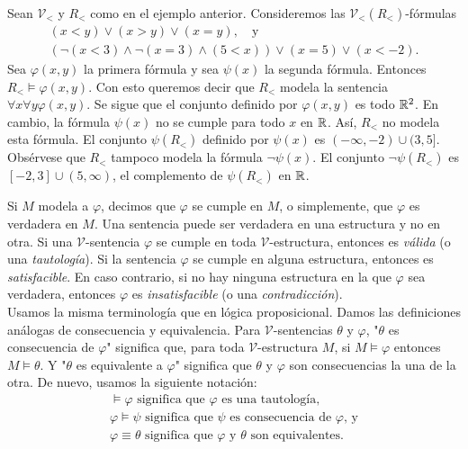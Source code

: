 \message{ !name(main.tex)}\documentclass[12pt,a4paper]{book}
\newcommand{\comillas}[1]{"#1"}
\newcommand{\VV}{\mathcal{V}}
\begin{document}
    \begin{ejemplo}\label{ej:conjunto-definible-orden}
        Sean $\VV_{<}$ y $R_{<}$ como en el ejemplo anterior. Consideremos las $\VV_{<}(R_{<})$-fórmulas
        \begin{gather*}
            (x<y)\vee(x>y)\vee(x=y),\quad\text{y}\\
            (\neg(x<3)\wedge\neg(x=3)\wedge(5<x))\vee(x=5)\vee(x<-2).
        \end{gather*}
        Sea $\varphi(x,y)$ la primera fórmula y sea $\psi(x)$ la segunda fórmula. Entonces $R_{<}\models\varphi(x,y)$. Con
        esto queremos decir que $R_{<}$ modela la sentencia $\forall x\forall y\varphi(x,y)$. Se sigue que el conjunto
        definido por $\varphi(x,y)$ es todo $\mathbb{R}^{2}$. En cambio, la fórmula $\psi(x)$ no se cumple para todo $x$ en $\mathbb{R}$.
        Así, $R_{<}$ no modela esta fórmula. El conjunto $\psi(R_{<})$ definido por $\psi(x)$ es $(-\infty,-2)\cup(3,5]$.
        Obsérvese que $R_{<}$ tampoco modela la fórmula $\neg\psi(x)$. El conjunto $\neg\psi(R_{<})$ es $[-2,3]\cup(5,\infty)$,
        el complemento de $\psi(R_{<})$ en $\mathbb{R}$.
    \end{ejemplo}

    Si $M$ modela a $\varphi$, decimos que $\varphi$ se cumple en $M$, o simplemente, que $\varphi$ es verdadera en $M$.
    Una sentencia puede ser verdadera en una estructura y no en otra. Si una $\VV$-sentencia $\varphi$ se cumple en toda
    $\VV$-estructura, entonces es \textit{válida} (o una \textit{tautología}). Si la sentencia $\varphi$ se cumple en alguna
    estructura, entonces es \textit{satisfacible}. En caso contrario, si no hay ninguna estructura en la que $\varphi$ sea
    verdadera, entonces $\varphi$ es \textit{insatisfacible} (o una \textit{contradicción}).\\
    Usamos la misma terminología que en lógica proposicional. Damos las definiciones análogas de consecuencia y
    equivalencia. Para $\VV$-sentencias $\theta$ y $\varphi$, \comillas{$\theta$ es consecuencia de $\varphi$} significa
    que, para toda $\VV$-estructura $M$, si $M\models\varphi$ entonces $M\models\theta$. Y \comillas{$\theta$ es
    equivalente a $\varphi$} significa que $\theta$ y $\varphi$ son consecuencias la una de la otra. De nuevo, usamos la
    siguiente notación:
    \begin{gather*}
        \models\varphi\text{ significa que $\varphi$ es una tautología,}\\
        \varphi\models\psi\text{ significa que $\psi$ es consecuencia de $\varphi$, y}\\
        \varphi\equiv\theta\text{ significa que $\varphi$ y $\theta$ son equivalentes.}
    \end{gather*}
\end{document}

